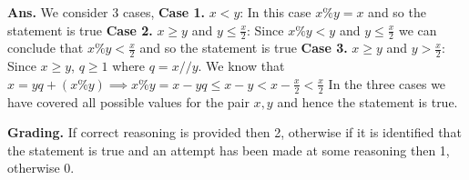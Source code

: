 \documentclass{article}
\begin{document}
\begin{flushleft}

\textbf{Ans. } We consider 3 cases, 
\linebreak
\textbf{Case 1.} $x < y$: 
\linebreak
In this case $x \% y = x$ and so the statement is true
\linebreak
\textbf{Case 2.} $x \geq y$ and $y \leq \frac{x}{2}$: 
\linebreak
Since $x \% y < y$ and $y \leq \frac{x}{2}$ we can conclude that 
$x \% y < \frac{x}{2}$ and so the statement is true
\linebreak
\textbf{Case 3.} $x \geq y$ and $y > \frac{x}{2}$: 
\linebreak
Since $x \geq y$, $q \geq 1$ where $q = x // y$. 
We know that $x = y q + (x \% y) \implies x \% y = x - y q \leq x - y < x - \frac{x}{2} < \frac{x}{2}$
\linebreak
In the three cases we have covered all possible values for the pair $x, y$ and hence the statement is true.
\end{flushleft}

\begin{flushleft}

\textbf{Grading. } If correct reasoning is provided then 2, otherwise if it is identified that the statement
is true and an attempt has been made at some reasoning then 1, otherwise 0.
    
\end{flushleft}
\end{document}
